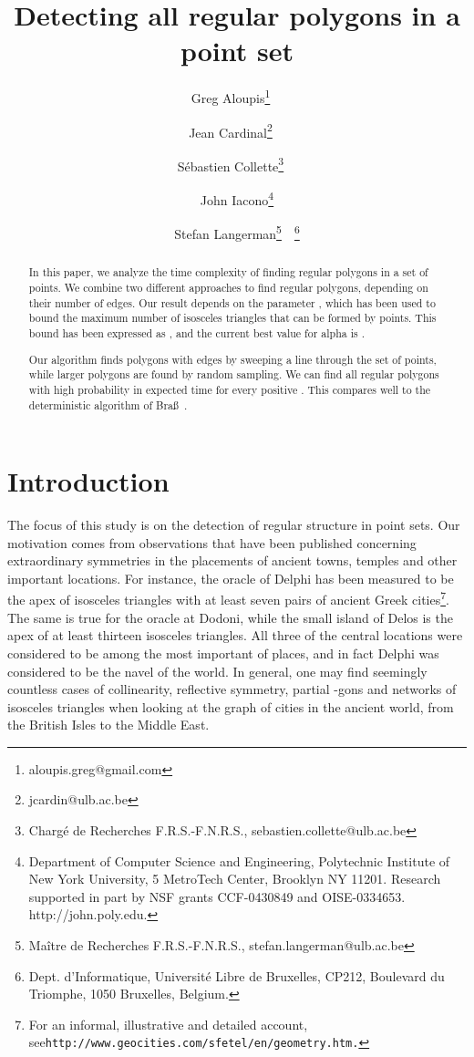 \documentclass{article}
\title{Detecting all regular polygons in a point set}
\author{Greg Aloupis\thanks{aloupis.greg@gmail.com}~~\footnotemark[6]
\and Jean Cardinal\thanks{jcardin@ulb.ac.be}~~\footnotemark[6]
\and S\'ebastien Collette\thanks{Charg\'{e} de Recherches F.R.S.-F.N.R.S.,
sebastien.collette@ulb.ac.be}~~\footnotemark[6]
\and John Iacono\thanks{Department of Computer  Science and Engineering,
Polytechnic Institute of New York University, 5 MetroTech Center, Brooklyn NY 11201. Research
supported in part by
NSF grants CCF-0430849 and OISE-0334653. http://john.poly.edu.}
\and Stefan Langerman\thanks{Ma\^{i}tre de Recherches F.R.S.-F.N.R.S.,
stefan.langerman@ulb.ac.be}~~\footnote{Dept. d'Informatique, Universit\'e Libre de Bruxelles, CP212,
Boulevard du Triomphe, 1050 Bruxelles, Belgium.}
}
\begin{document}
\maketitle

\begin{abstract}
In this paper, we analyze the time complexity of finding regular polygons
in a set of  points. We combine two different approaches to find
regular polygons, depending on their number of edges.  
Our result depends on the parameter , which has been used to bound
the maximum number of isosceles triangles that can be formed by  points. 
This bound has been expressed as , and the current best value
for alpha is .

Our algorithm finds polygons with 
 edges  by sweeping a line through the set of
points, while  larger polygons are found by random sampling. We can
find all regular polygons with high probability in  expected time for
every positive .  This compares well to the
 deterministic algorithm of Bra{\ss}~\cite{brass}.
\end{abstract}




\section{Introduction}


The focus of this study is on the detection of regular structure in point sets.
Our motivation comes from observations that have been published concerning
extraordinary symmetries in the placements of ancient towns, temples and other
important locations. 
For instance, the oracle of Delphi has been measured to
be the apex of isosceles triangles with at least seven pairs of ancient Greek
cities\footnote{For an informal, illustrative and detailed account, see\newline \tt{http://www.geocities.com/sfetel/en/geometry.htm}.}.  The same is true for the oracle at Dodoni, while the small island
of Delos is the apex of at least thirteen isosceles triangles.  All three of the
central locations were considered to be among the most important of places, and
in fact Delphi was considered to be the navel of the world.  In general, one may
find seemingly countless cases of collinearity, reflective symmetry,
partial -gons and networks of 
isosceles triangles when looking at the graph of cities in the ancient world, 
from the British Isles to the Middle East.  
\end{document}
